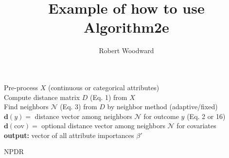 \documentclass{article}
\title{Example of how to use Algorithm2e}
\author{Robert Woodward}
\begin{document}
\begin{algorithm}[H]
{}
Pre-process $X$ (continuous or categorical attributes)\\
Compute distance matrix $D$ (Eq. 1) from $X$\\
Find neighbors $\mathcal{N}$ (Eq. 3) from $D$ by neighbor method (adaptive/fixed)\\
$\mathbf{d}(y)=$ distance vector among neighbors $\mathcal{N}$ for outcome $y$ (Eq. 2 or 16)\\
$\mathbf{d}(\textrm{cov})=$ optional distance vector among neighbors $\mathcal{N}$ for covariates\\
{\textbf{output:} vector of all attribute importances {\boldmath$\beta'$}}
\caption{NPDR}
\end{algorithm}
\end{document}
